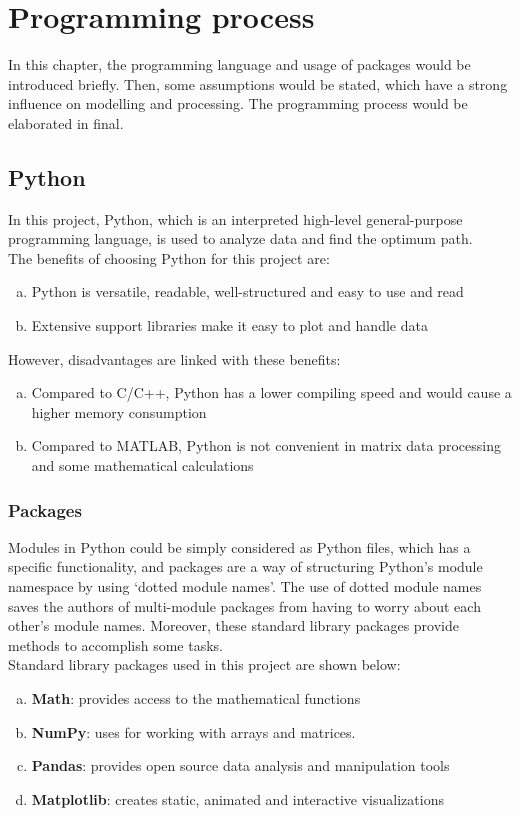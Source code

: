 \chapter{Programming process}
\label{progprocess}
In this chapter, the programming language and usage of packages would be introduced briefly. Then, some assumptions would be stated, which have a strong influence on modelling and processing. The programming process would be elaborated in final.
\section{Python}
In this project, Python, which is an interpreted high-level general-purpose programming language, is used to analyze data and find the optimum path.
\\The benefits of choosing Python for this project are:
\begin{enumerate}[a)]
    \item Python is versatile, readable, well-structured and easy to use and read
    \item Extensive support libraries make it easy to plot and handle data
\end{enumerate}
However, disadvantages are linked with these benefits:
\begin{enumerate}[a)]
    \item Compared to C/C++, Python has a lower compiling speed and would cause a higher memory consumption
    \item Compared to MATLAB, Python is not convenient in matrix data processing and some mathematical calculations
\end{enumerate}
\subsection{Packages}
Modules in Python could be simply considered as Python files, which has a specific functionality, and packages are a way of structuring Python's module namespace by using `dotted module names'.  The use of dotted module names saves the authors of multi-module packages from having to worry about each other's module names. Moreover, these standard library packages provide methods to accomplish some tasks.
\\Standard library packages used in this project are shown below:
\begin{enumerate}[a)]
    \item \textbf{Math}: provides access to the mathematical functions
    \item \textbf{NumPy}: uses for working with arrays and matrices.
    \item \textbf{Pandas}: provides open source data analysis and manipulation tools
    \item \textbf{Matplotlib}: creates static, animated and interactive visualizations
\end{enumerate}


